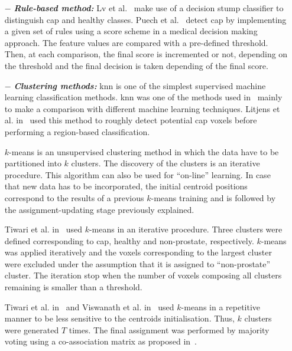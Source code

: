 \begin{enumerate}[leftmargin=*]

\item[$-$] \textbf{\textit{Rule-based method:}} Lv et al.~\cite{Lv2009} make use of a decision stump classifier to distinguish \ac{cap} and healthy classes. Puech et al.~\cite{Puech2009} detect \ac{cap} by implementing a given set of rules using a score scheme in a medical decision making approach. The feature values are compared with a pre-defined threshold. Then, at each comparison, the final score is incremented or not, depending on the threshold and the final decision is taken depending of the final score.

\item[$-$] \textbf{\textit{Clustering methods:}} \acf{knn} is one of the simplest supervised machine learning classification methods. \ac{knn} was one of the methods used in~\cite{Niaf2011,Niaf2012} mainly to make a comparison with different machine learning techniques. Litjens et al. in~\cite{Litjens2012} used this method to roughly detect potential \ac{cap} voxels before performing a region-based classification.

  $k$-means is an unsupervised clustering method in which the data have to be partitioned into $k$ clusters. The discovery of the clusters is an iterative procedure. This algorithm can also be used for ``on-line'' learning. In case that new data has to be incorporated, the initial centroid positions correspond to the results of a previous $k$-means training and is followed by the assignment-updating stage previously explained.

  Tiwari et al. in~\cite{Tiwari2007,Tiwari2009} used $k$-means in an iterative procedure. Three clusters were defined corresponding to \ac{cap}, healthy and non-prostate, respectively. $k$-means was applied iteratively and the voxels corresponding to the largest cluster were excluded under the assumption that it is assigned to ``non-prostate'' cluster. The iteration stop when the number of voxels composing all clusters remaining is smaller than a threshold.

 Tiwari et al. in~\cite{Tiwari2008} and Viswanath et al. in~\cite{Viswanath2008,Viswanath2008a} used $k$-means in a repetitive manner to be less sensitive to the centroids initialisation. Thus, $k$ clusters were generated $T$ times. The final assignment was performed by majority voting using a co-association matrix as proposed in~\cite{Fred2005}.


\end{enumerate}
